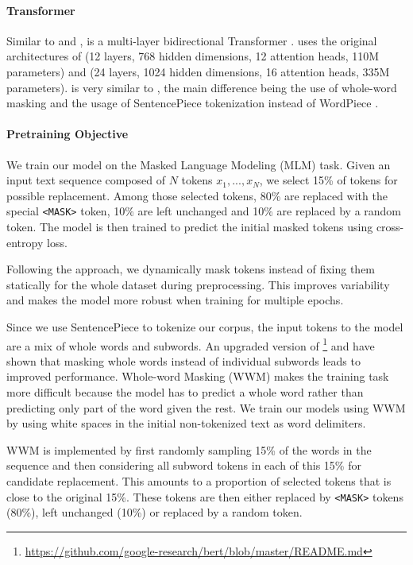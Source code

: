 \paragraph{Transformer}
Similar to \roberta and \bert, \camembert is a multi-layer bidirectional Transformer \citep{vaswani-etal-2017-attention}. \camembert uses the original architectures of \bertbase (12 layers, 768 hidden dimensions, 12 attention heads, 110M parameters) and \bertlarge (24 layers, 1024 hidden dimensions, 16 attention heads, 335M parameters). \camembert is very similar to \roberta, the main difference being the use of whole-word masking and the usage of SentencePiece tokenization \citep{kudo-richardson-2018-sentencepiece} instead of WordPiece \citep{schuster-nakajima-2012-japanese}.

\paragraph{Pretraining Objective}
We train our model on the Masked Language Modeling (MLM) task.
Given an input text sequence composed of $N$ tokens $x_1, ..., x_N$, we select 15\% of tokens for possible replacement. Among those selected tokens, 80\% are replaced with the special \texttt{<MASK>} token, 10\% are left unchanged and 10\% are replaced by a random token. The model is then trained to predict the initial masked tokens using cross-entropy loss.

Following the \roberta approach, we dynamically mask tokens instead of fixing them statically for the whole dataset during preprocessing. This improves variability and makes the model more robust when training for multiple epochs.

Since we use SentencePiece to tokenize our corpus, the input tokens to the model are a mix of whole words and subwords. An upgraded version of \bert\footnote{\url{https://github.com/google-research/bert/blob/master/README.md}} and \citet{joshi-etal-2020-spanbert} have shown that masking whole words instead of individual subwords leads to improved performance. Whole-word Masking (WWM) makes the training task more difficult because the model has to predict a whole word rather than predicting only part of the word given the rest. We train our models using WWM by using white spaces in the initial non-tokenized text as word delimiters.

WWM is implemented by first randomly sampling 15\% of the words in the sequence and then considering all subword tokens in each of this 15\% for candidate replacement. This amounts to a proportion of selected tokens that is close to the original 15\%. These tokens are then either replaced by \texttt{<MASK>} tokens (80\%), left unchanged (10\%) or replaced by a random token.

